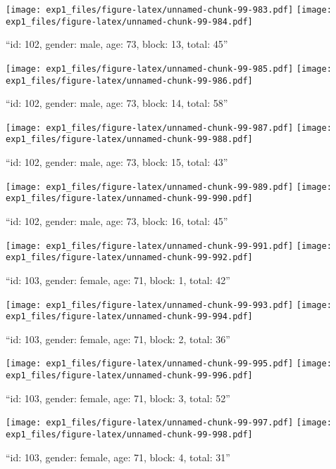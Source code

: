 \documentclass[,]{article}
\begin{document}
\texttt{[image: exp1\_files/figure-latex/unnamed-chunk-99-983.pdf]}
\texttt{[image: exp1\_files/figure-latex/unnamed-chunk-99-984.pdf]}

\newpage
[1] 

``id: 102, gender: male, age: 73, block: 13, total: 45''

\texttt{[image: exp1\_files/figure-latex/unnamed-chunk-99-985.pdf]}
\texttt{[image: exp1\_files/figure-latex/unnamed-chunk-99-986.pdf]}

\newpage
[1] 

``id: 102, gender: male, age: 73, block: 14, total: 58''

\texttt{[image: exp1\_files/figure-latex/unnamed-chunk-99-987.pdf]}
\texttt{[image: exp1\_files/figure-latex/unnamed-chunk-99-988.pdf]}

\newpage
[1] 

``id: 102, gender: male, age: 73, block: 15, total: 43''

\texttt{[image: exp1\_files/figure-latex/unnamed-chunk-99-989.pdf]}
\texttt{[image: exp1\_files/figure-latex/unnamed-chunk-99-990.pdf]}

\newpage
[1] 

``id: 102, gender: male, age: 73, block: 16, total: 45''

\texttt{[image: exp1\_files/figure-latex/unnamed-chunk-99-991.pdf]}
\texttt{[image: exp1\_files/figure-latex/unnamed-chunk-99-992.pdf]}

\newpage
[1] 

``id: 103, gender: female, age: 71, block: 1, total: 42''

\texttt{[image: exp1\_files/figure-latex/unnamed-chunk-99-993.pdf]}
\texttt{[image: exp1\_files/figure-latex/unnamed-chunk-99-994.pdf]}

\newpage
[1] 

``id: 103, gender: female, age: 71, block: 2, total: 36''

\texttt{[image: exp1\_files/figure-latex/unnamed-chunk-99-995.pdf]}
\texttt{[image: exp1\_files/figure-latex/unnamed-chunk-99-996.pdf]}

\newpage
[1] 

``id: 103, gender: female, age: 71, block: 3, total: 52''

\texttt{[image: exp1\_files/figure-latex/unnamed-chunk-99-997.pdf]}
\texttt{[image: exp1\_files/figure-latex/unnamed-chunk-99-998.pdf]}

\newpage
[1] 

``id: 103, gender: female, age: 71, block: 4, total: 31''
\end{document}
